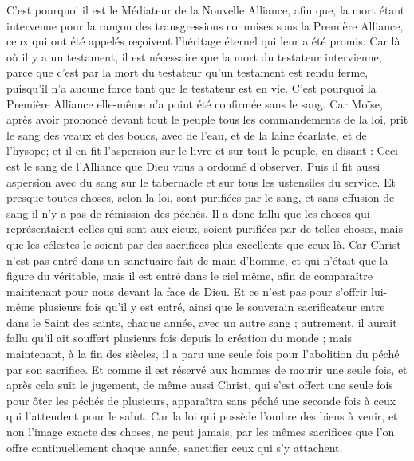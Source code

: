 \begin{multicols}{2}
C'est pourquoi il est le Médiateur de la Nouvelle Alliance, afin que, la mort étant intervenue pour la rançon des transgressions commises sous la Première Alliance, ceux qui ont été appelés reçoivent l'héritage éternel qui leur a été promis.
Car là où il y a un testament, il est nécessaire que la mort du testateur intervienne,
parce que c'est par la mort du testateur qu'un testament est rendu ferme, puisqu'il n'a aucune force tant que le testateur est en vie.
C'est pourquoi la Première Alliance elle-même n'a point été confirmée sans le sang.
Car Moïse, après avoir prononcé devant tout le peuple tous les commandements de la loi, prit le sang des veaux et des boucs, avec de l'eau, et de la laine écarlate, et de l'hysope; et il en fit l'aspersion sur le livre et sur tout le peuple, en disant :
Ceci est le sang de l'Alliance que Dieu vous a ordonné d'observer.
Puis il fit aussi aspersion avec du sang sur le tabernacle et sur tous les ustensiles du service.
Et presque toutes choses, selon la loi, sont purifiées par le sang, et sans effusion de sang il n'y a pas de rémission des péchés.
Il a donc fallu que les choses qui représentaient celles qui sont aux cieux, soient purifiées par de telles choses, mais que les célestes le soient par des sacrifices plus excellents que ceux-là.
Car Christ n'est pas entré dans un sanctuaire fait de main d'homme, et qui n'était que la figure du véritable, mais il est entré dans le ciel même, afin de comparaître maintenant pour nous devant la face de Dieu.
Et ce n'est pas pour s'offrir lui-même plusieurs fois qu'il y est entré, ainsi que le souverain sacrificateur entre dans le Saint des saints, chaque année, avec un autre sang ;
autrement, il aurait fallu qu'il ait souffert plusieurs fois depuis la création du monde ; mais maintenant, à la fin des siècles, il a paru une seule fois pour l'abolition du péché par son sacrifice.
Et comme il est réservé aux hommes de mourir une seule fois, et après cela suit le jugement,
de même aussi Christ, qui s'est offert une seule fois pour ôter les péchés de plusieurs, apparaîtra sans péché une seconde fois à ceux qui l'attendent pour le salut.
\VerseOne{}Car la loi qui possède l'ombre des biens à venir, et non l'image exacte des choses, ne peut jamais, par les mêmes sacrifices que l'on offre continuellement chaque année, sanctifier ceux qui s'y attachent.

\end{multicols}
